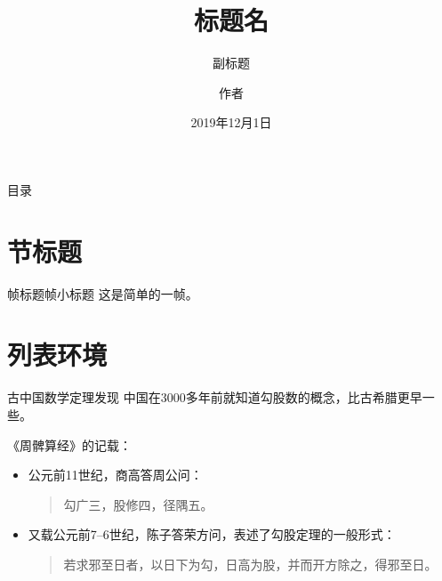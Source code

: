 \documentclass[xcolor=table,aspectratio=169]{beamer}
\title[标题短形式]{标题名} %
\subtitle{副标题}
\author{作者}
\institute{机构、学院}
\date{2019年12月1日}  %
\begin{document}
	
\begin{frame}[plain] %
\titlepage  
\end{frame}

\begin{frame}{目录}
	\tableofcontents  %
\end{frame}

\section{节标题}  %
\begin{frame}{帧标题}{帧小标题}
这是简单的一帧。
\end{frame}



\section{列表环境} 
\begin{frame}{古中国数学}{定理发现}
中国在3000多年前就知道勾股数的概念，比古希腊更早一些。

《周髀算经》的记载：
\begin{itemize} %
	\item 公元前11世纪，商高答周公问：
	\begin{quote}  %
		勾广三，股修四，径隅五。
	\end{quote}
    \item 又载公元前7--6世纪，\cite{__2000}陈子答荣方问，表述了勾股定理的\cite{brown_long-term_2010}一般形式：
    \begin{quote}
    	若求邪至日者，以日下为勾，日高为股，并而开方除之，得邪至日。
    \end{quote}
\end{itemize}
\end{frame}
\end{document}
